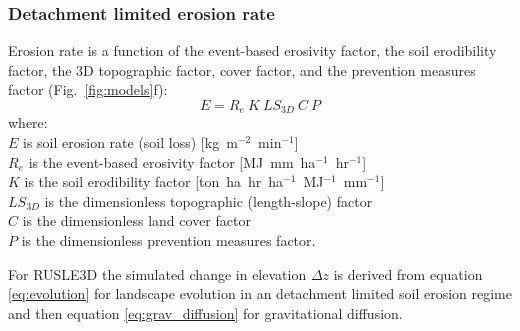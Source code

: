\documentclass[gmd, manuscript]{copernicus}
\begin{document}

\subsubsection{Detachment limited erosion rate}

Erosion rate is a function of the event-based erosivity factor, 
the soil erodibility factor, the 3D topographic factor, cover factor, and the prevention measures factor 
(Fig.~\ref{fig:models}f):
%
\begin{equation}
\label{eq:rusle}
{E = R_e ~ K ~ LS_{3D} ~ C ~ P}
\end{equation}
%
{\small
\noindent
where: \\
\noindent
\hspace*{0.5em} $E$ is soil erosion rate (soil loss) [\unit{kg~m}$^{-2}$~\unit{min}$^{-1}$]\\
\hspace*{0.5em} $R_e$ is the event-based erosivity factor [\unit{MJ~mm~ha}$^{-1}$~\unit{hr}$^{-1}$]\\
\hspace*{0.5em} $K$ is the soil erodibility factor [\unit{ton~ha~hr~ha}$^{-1}$~\unit{MJ}$^{-1}$~\unit{mm}$^{-1}$]\\
\hspace*{0.5em} $LS_{3D}$ is the dimensionless topographic (length-slope) factor\\
\hspace*{0.5em} $C$ is the dimensionless land cover factor\\
\hspace*{0.5em} $P$ is the dimensionless prevention measures factor.\\
}

\noindent
For RUSLE3D the simulated change in elevation 
$\Delta z$
is derived from 
equation \ref{eq:evolution}
for landscape evolution in an detachment limited soil erosion regime
and then equation \ref{eq:grav_diffusion}
for gravitational diffusion.

\end{document}
